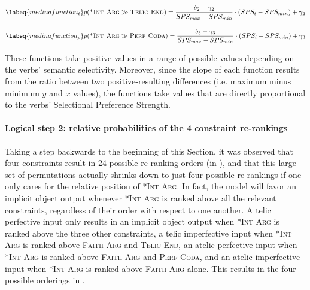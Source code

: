\begin{equation} \labeq{medinafunction_t}
p(\textsc{*Int Arg} \gg \textsc{Telic End}) = \frac{\delta_2 - \gamma_2}{SPS_{max} - SPS_{min}} \cdot ({SPS_{i} - SPS_{min}}) + \gamma_2
\end{equation}

\begin{equation} \labeq{medinafunction_p}
p(\textsc{*Int Arg} \gg \textsc{Perf Coda}) = \frac{\delta_3 - \gamma_3}{SPS_{max} - SPS_{min}} \cdot ({SPS_{i} - SPS_{min}}) + \gamma_3
\end{equation}

These functions take positive values in a range of possible values depending on the verbs' semantic selectivity. Moreover, since the slope of each function results from the ratio between two positive-resulting differences (i.e. maximum minus minimum $y$ and $x$ values), the functions take values that are directly proportional to the verbs' Selectional Preference Strength.

\paragraph{Logical step 2: relative probabilities of the 4 constraint re-rankings} Taking a step backwards to the beginning of this Section, it was observed that four constraints result in 24 possible re-ranking orders (in ), and that this large set of permutations actually shrinks down to just four possible re-rankings if one only cares for the relative position of \textsc{*Int Arg}. In fact, the model will favor an implicit object output whenever \textsc{*Int Arg} is ranked above all the relevant constraints, regardless of their order with respect to one another. A telic perfective input only results in an implicit object output when \textsc{*Int Arg} is ranked above the three other constraints, a telic imperfective input when \textsc{*Int Arg} is ranked above \textsc{Faith Arg} and \textsc{Telic End}, an atelic perfective input when \textsc{*Int Arg} is ranked above \textsc{Faith Arg} and \textsc{Perf Coda}, and an atelic imperfective input when \textsc{*Int Arg} is ranked above \textsc{Faith Arg} alone. This results in the four possible orderings in .

